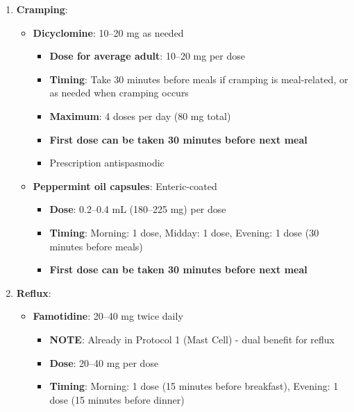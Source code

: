 \begin{enumerate}
\begin{itemize}
        \item \textbf{Low-fermentation diet}: Reduce FODMAPs (fermentable carbohydrates)
        \begin{itemize}
            \item Start immediately by avoiding: onions, garlic, wheat, beans, dairy
            \item Trial for 2--4 weeks to assess benefit
        \end{itemize}
    \end{itemize}

    \item \textbf{Cramping}:
    \begin{itemize}
        \item \textbf{Dicyclomine}: 10--20 mg as needed
        \begin{itemize}
            \item \textbf{Dose for average adult}: 10--20 mg per dose
            \item \textbf{Timing}: Take 30 minutes before meals if cramping is meal-related, or as needed when cramping occurs
            \item \textbf{Maximum}: 4 doses per day (80 mg total)
            \item \textbf{First dose can be taken 30 minutes before next meal}
            \item Prescription antispasmodic
        \end{itemize}

        \item \textbf{Peppermint oil capsules}: Enteric-coated
        \begin{itemize}
            \item \textbf{Dose}: 0.2--0.4 mL (180--225 mg) per dose
            \item \textbf{Timing}: Morning: 1 dose, Midday: 1 dose, Evening: 1 dose (30 minutes before meals)
            \item \textbf{First dose can be taken 30 minutes before next meal}
        \end{itemize}
    \end{itemize}

    \item \textbf{Reflux}:
    \begin{itemize}
        \item \textbf{Famotidine}: 20--40 mg twice daily
        \begin{itemize}
            \item \textbf{NOTE}: Already in Protocol 1 (Mast Cell) - dual benefit for reflux
            \item \textbf{Dose}: 20--40 mg per dose
            \item \textbf{Timing}: Morning: 1 dose (15 minutes before breakfast), Evening: 1 dose (15 minutes before dinner)
        \end{itemize}


\end{itemize}
\end{enumerate}
